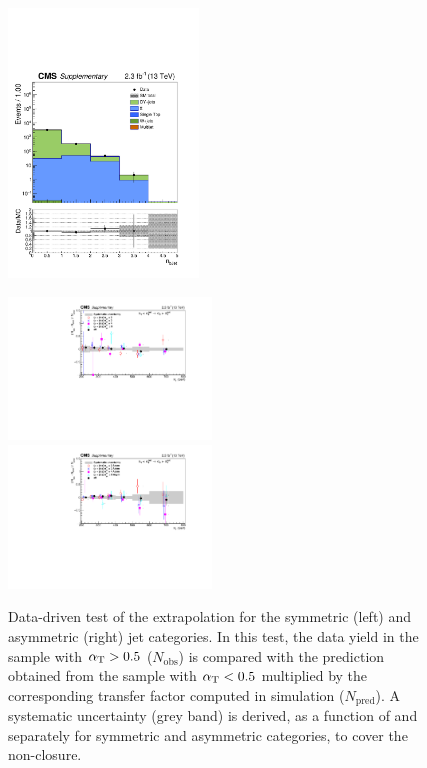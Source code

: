 \begin{figure}[tbhp]
\begin{center}
     \includegraphics[width=0.45\textwidth]{figures/DoubleMu_nBJet40_all_all} \\
  \end{center}
\end{figure}


\clearpage
\begin{figure}[tbhp]
    \caption{ 
  Data-driven test of the \alt extrapolation for the symmetric (left) and asymmetric (right) jet categories. 
  In this test, the data yield in the \mj sample with $\alpha_{\text{T}}>0.5$ ($N_{\mathrm{obs}}$) 
  is compared with the prediction obtained from the \mj sample with $\alpha_{\text{T}}<0.5$ multiplied by the corresponding 
  transfer factor computed in simulation ($N_{\mathrm{pred}}$). 
  A systematic uncertainty (grey band) is derived, as a function of \scalht and separately for symmetric and asymmetric categories, 
  to cover the non-closure. 
    \label{fig:CT-alphaT} }
  \begin{center}
     \includegraphics[width=0.48\textwidth]{figures/alphaTsym__noFit} ~~
     \includegraphics[width=0.48\textwidth]{figures/alphaTasym__noFit}
  \end{center}
\end{figure}

